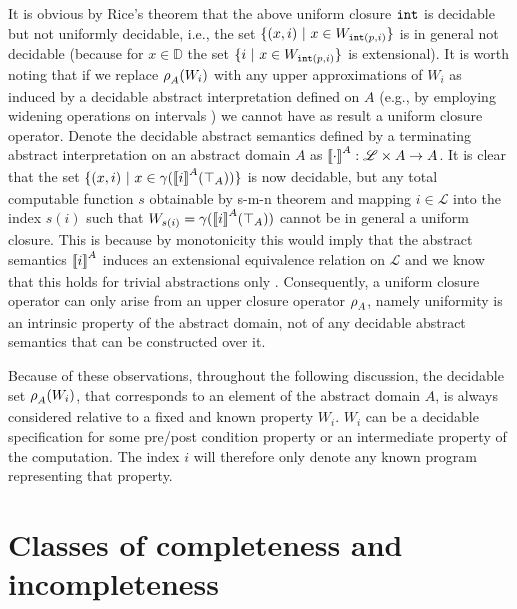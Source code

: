 \documentclass[runningheads]{llncs}
\def\ok#1{\mbox{\raisebox{0ex}[1ex][1ex]{$#1$}}}
\def\grasse#1{{\llbracket #1 \rrbracket}}
\newcommand{\ccL}{\mathscr{L}}
\newcommand{\Domain}{\mathbb{D}}
\newcommand{\auco}[2]{\ok{\rho^{#1}_{#2}}}
\newcommand{\ra}{\rightarrow}
\def\ok#1{\mbox{\raisebox{0ex}[1ex][1ex]{$#1$}}}
\def\cAA{\ensuremath{A}}
\newcommand{\sset}[2]{\{#1  ~|~ #2\}}
\begin{document}
It is obvious by Rice's theorem that the above uniform closure ${\tt int}$ is decidable but not uniformly decidable, i.e., the set $\sset{(x,i)}{x\in W_{{\tt int}(p,i)}}$ is in general not decidable (because for $x\in\Domain$ the set $\sset{i}{x\in W_{{\tt int}(p,i)}}$ is extensional). It is worth noting that if we replace $\auco{}{\cAA}(W_i)$ with any upper approximations of $W_i$ as induced by a decidable abstract interpretation defined on $\cAA$ (e.g., by employing widening operations on intervals \cite{CC77}) we cannot have as result a uniform closure operator. Denote the decidable abstract semantics defined by a terminating abstract interpretation on an abstract domain $\cAA$ as $\ok{\grasse{\cdot}^\cAA:\ccL\times\cAA\ra\cAA}$. It is clear that the set $\ok{\sset{(x,i)}{x\in\gamma(\grasse{i}^\cAA(\top_A))}}$ is now decidable, but any total computable function $s$ obtainable by s-m-n theorem and mapping $i\in\ccL$ into the index $s(i)$ such that $\ok{W_{s(i)}=\gamma(\grasse{i}^\cAA(\top_A))}$ cannot be in general a uniform closure. This is because by monotonicity this would imply that the abstract semantics $\ok{\grasse{i}^\cAA}$ induces an extensional equivalence relation on $\ccL$ and we know that this holds for trivial abstractions only \cite{BruniGGGP20}.
Consequently, a uniform closure operator can only arise from an upper closure operator $\auco{}{\cAA}$, namely uniformity is an intrinsic property of the abstract domain, not of any decidable abstract semantics that can be constructed over it. 

\smallskip

Because of these observations, throughout the following discussion, the decidable set $\auco{}{\cAA}(W_i)$, that corresponds to an element of the abstract domain $\cAA$, is always considered relative to a fixed and known property $W_i$. $W_i$ can be a decidable specification for some pre/post condition property or an intermediate property of the computation. The index $i$ will therefore only denote any known program representing that property.


\section{Classes of completeness and incompleteness}
\end{document}
